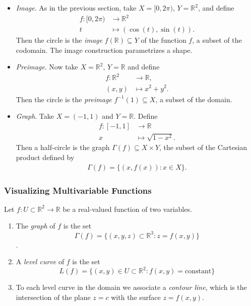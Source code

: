 \documentclass[12pt,letterpaper,reqno]{article}
\numberwithin{equation}{section}
\newcommand{\R}{\ensuremath{\mathbb R}}
\begin{document}
{\begin{itemize}
	\item \emph{Image}. As in the previous section, take $X=[0,2\pi)$, $Y=\R^2$, and define
	\begin{align*}
		f:[0,2\pi) &\to \R^2 \\
		t &\mapsto (\cos(t),\sin(t)).
	\end{align*}
	Then the circle is the \emph{image} $f(\R) \subseteq Y$ of the function $f$, a subset of the codomain. The image construction parametrizes a shape.
	\item \emph{Preimage}. Now take $X=\R^2$, $Y=\R$ and define
	\begin{align*}
		f:\R^2 &\to \R, \\
		(x,y) &\mapsto x^2+y^2. 
	\end{align*}
	Then the circle is the \emph{preimage} $f^{-1}(1) \subseteq X$, a subset of the domain.
	\item \emph{Graph}. Take $X=(-1,1)$ and $Y=\R$. Define
	\begin{align*}
		f:[-1,1] &\to \R \\
		x &\mapsto \sqrt{1-x^2}.
	\end{align*}
	Then a half-circle is the graph $\Gamma(f) \subseteq X \times Y$, the subset of the Cartesian product defined by
	\begin{align*}
		\Gamma(f)=\{(x,f(x)): x \in X\}.
	\end{align*}
\end{itemize}

\subsubsection{Visualizing Multivariable Functions}
\begin{defn}
	Let $f:U \subset \mathbb{R}^2 \to \mathbb{R}$ be a real-valued function of two variables.  
\begin{enumerate}[(1)]
	\item The \emph{graph} of $f$ is the set $$\Gamma(f)=\{(x,y,z) \subset \mathbb{R}^3:z=f(x,y)\}$$.
	\item A \emph{level curve} of $f$ is the set
	$$L(f)=\{(x,y) \in U \subset \mathbb{R}^2:f(x,y)=\text{constant}\}$$
	\item To each level curve in the domain we associate a \emph{contour line}, which is the intersection of the plane $z=c$ with the surface $z=f(x,y)$. \\
\end{enumerate}
\end{defn}

}
\end{document}
